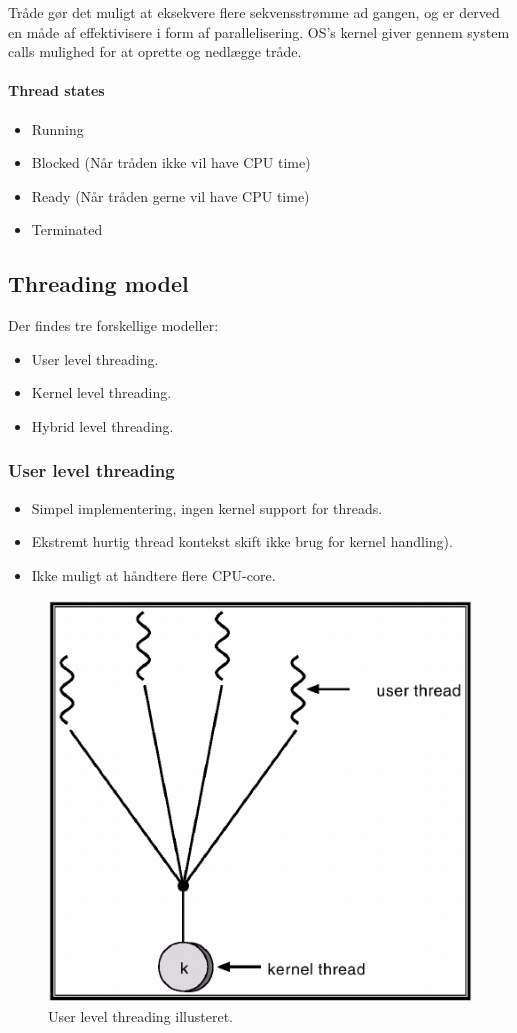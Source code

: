 Tråde gør det muligt at eksekvere flere sekvensstrømme ad gangen, og er derved en måde af effektivisere i form af parallelisering. OS's kernel giver gennem system calls mulighed for at oprette og nedlægge tråde.

\paragraph{Thread states}
\begin{itemize}
	\item Running
	\item Blocked (Når tråden ikke vil have CPU time)
	\item Ready (Når tråden gerne vil have CPU time)
	\item Terminated
\end{itemize}


\subsection{Threading model}
Der findes tre forskellige modeller:

\begin{itemize}
	\item User level threading.
	\item Kernel level threading.
	\item Hybrid level threading.
\end{itemize}

\subsubsection{User level threading}
\begin{itemize}
	\item Simpel implementering, ingen kernel support for threads.
	\item Ekstremt hurtig thread kontekst skift ikke brug for kernel handling).
	\item Ikke muligt at håndtere flere CPU-core.
\end{itemize}

\begin{figure}[H]
	\centering
	\includegraphics[width=0.5\linewidth]{figs/userthreads}
	\caption{User level threading illusteret.}
	\label{fig:userthreads}
\end{figure}

